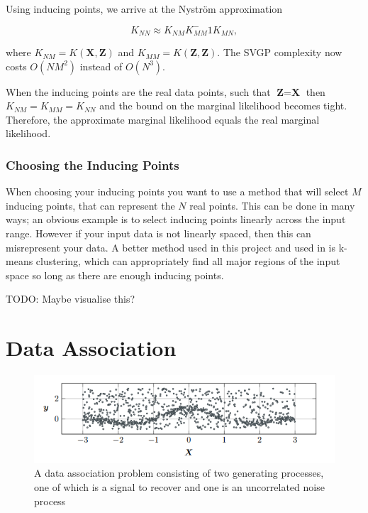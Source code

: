 \documentclass[12pt,a4paper]{report}
\theoremstyle{definition}
\begin{document}
Using inducing points, we arrive at the Nystr{\"o}m approximation

\begin{equation}
	K_{NN} \approx K_{NM} K_{MM}^-1 K_{MN},
\end{equation}

where $K_{NM} = K(\textbf{X}, \textbf{Z})$ and $K_{MM} = K(\textbf{Z}, \textbf{Z})$.
The SVGP complexity now costs $O(NM^2)$ instead of $O(N^3)$.

When the inducing points are the real data points, such that $\textbf{Z} = \textbf{X}$ then $K_{NM} = K_{MM} = K_{NN}$ and the bound on the marginal likelihood becomes tight. 
Therefore, the approximate marginal likelihood equals the real marginal likelihood.

\subsubsection{Choosing the Inducing Points}

When choosing your inducing points you want to use a method that will select $M$ inducing points, that can represent the $N$ real points.
This can be done in many ways; an obvious example is to select inducing points linearly across the input range. 
However if your input data is not linearly spaced, then this can misrepresent your data.
A better method used in this project and used in \citet{Hensman2014} is k-means clustering, which can appropriately find all major regions of the input space so long as there are enough inducing points.

TODO: Maybe visualise this?

\section{Data Association}

\begin{figure}[H]
    \centering
    \includegraphics[width=\linewidth]{data_association_problem.png}
    \caption{A data association problem consisting of two generating processes, one of which is a signal to recover and one is an uncorrelated noise process \citep{Kaiser2018}}
    \label{fig:DataAssocProblem}
\end{figure}
\end{document}
